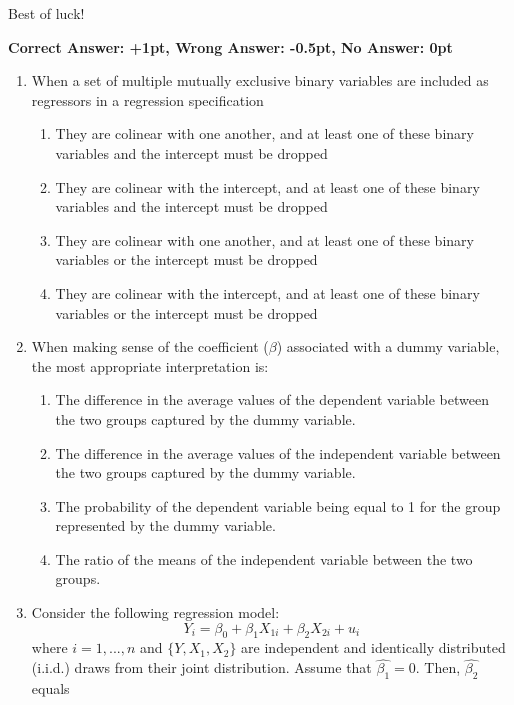 \documentclass{article}
\begin{document}
\vspace{1cm}

Best of luck!


\newpage

{\large \textbf{Correct Answer: +1pt, Wrong Answer: -0.5pt, No Answer: 0pt}}\\[1em]



\begin{enumerate}

\item  When a set of multiple mutually exclusive binary variables are included as regressors in a regression specification
  \begin{enumerate}[label=\alph*)]
  \item They are colinear with one another, and at least one of these binary variables and the intercept must be dropped  
  \item They are colinear with the intercept, and at least one of these binary variables and the intercept must be dropped  
  \item They are colinear with one another, and at least one of these binary variables or the intercept must be dropped  
  \item They are colinear with the intercept, and at least one of these binary variables or the intercept must be dropped  
  \end{enumerate}\vspace{.25cm}

\item When making sense of the coefficient ($\beta$) associated with a dummy variable, the most appropriate interpretation is:
\begin{enumerate}[label=\alph*)]
    \item The difference in the average values of the dependent variable between the two groups captured by the dummy variable.
    \item The difference in the average values of the independent variable between the two groups captured by the dummy variable.
    \item The probability of the dependent variable being equal to 1 for the group represented by the dummy variable.
    \item The ratio of the means of the independent variable between the two groups.
\end{enumerate}\vspace{.25cm}

\item Consider the following regression model:
\begin{equation*}
    Y_i = \beta_0 + \beta_1 X_{1i} + \beta_2 X_{2i} + u_i
\end{equation*}
where $i=1,...,n$ and $\{Y, X_1, X_2\}$ are independent and identically distributed (i.i.d.) draws from their joint
distribution. Assume that $\hat{\beta_1}=0$. Then,  $\hat{\beta_2}$ equals


\end{enumerate}
\end{document}
